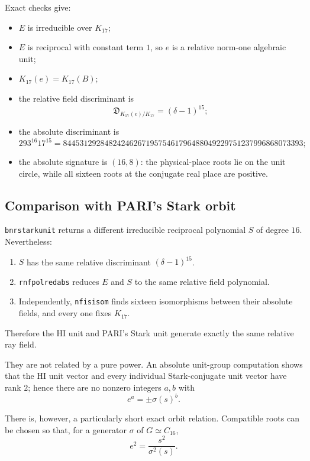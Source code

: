 \documentclass[11pt,reqno]{amsart}
\theoremstyle{plain}
\begin{document}
Exact checks give:

\begin{itemize}
\item \(E\) is irreducible over \(K_{17}\);
\item \(E\) is reciprocal with constant term \(1\), so \(e\) is a relative norm-one algebraic unit;
\item \(K_{17}(e)=K_{17}(B)\);
\item the relative field discriminant is
\[
\mathfrak D_{K_{17}(e)/K_{17}}=(\delta-1)^{15};
\]
\item the absolute discriminant is
\[
293^{16}17^{15}
=8445312928482424626719575461796488049229751237996868073393;
\]
\item the absolute signature is \((16,8)\): the physical-place roots lie on the unit circle, while all sixteen roots at the conjugate real place are positive.
\end{itemize}

\subsection{Comparison with PARI's Stark orbit}\label{sec:21.3}

\texttt{bnrstarkunit} returns a different irreducible reciprocal polynomial \(S\) of degree \(16\). Nevertheless:

\begin{enumerate}
\item \(S\) has the same relative discriminant \((\delta-1)^{15}\).
\item \texttt{rnfpolredabs} reduces \(E\) and \(S\) to the same relative field polynomial.
\item Independently, \texttt{nfisisom} finds sixteen isomorphisms between their absolute fields, and every one fixes \(K_{17}\).
\end{enumerate}

Therefore the HI unit and PARI's Stark unit generate exactly the same relative ray field.

They are not related by a pure power. An absolute unit-group computation shows that the HI unit vector and every individual Stark-conjugate unit vector have rank \(2\); hence there are no nonzero integers \(a,b\) with
\[
e^a=\pm\sigma(s)^b.
\]

There is, however, a particularly short exact orbit relation. Compatible roots can be chosen so that, for a generator \(\sigma\) of \(G\simeq C_{16}\),
\[
\boxed{
e^2=\frac{s^2}{\sigma^2(s)}.
}
\]
\end{document}
